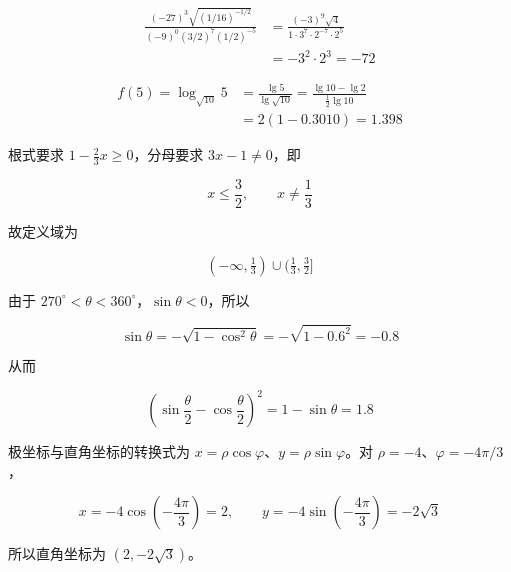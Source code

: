 \begin{answer}

\nopagebreak[4]
\[
\begin{aligned}
\frac{(-27)^3\sqrt{(1/16)^{-1/2}}}
{(-9)^0(3/2)^7(1/2)^{-5}}
&=\frac{(-3)^9\sqrt4}{1\cdot3^7\cdot2^{-7}\cdot2^5}\\
&=-3^2\cdot2^3=-72
\end{aligned}
\]


\nopagebreak[4]
\[
\begin{aligned}
f(5)=\log_{\sqrt{10}}5
&=\frac{\lg5}{\lg\sqrt{10}}
=\frac{\lg10-\lg2}{\frac12\lg10}\\
&=2(1-0.3010)=1.398
\end{aligned}
\]


根式要求 $1-\frac23x\ge0$，分母要求 $3x-1\ne0$，即

\nopagebreak[4]
\[
x\le\frac32,\qquad x\ne\frac13
\]

故定义域为

\nopagebreak[4]
\[
(-\infty,\tfrac13)\cup(\tfrac13,\tfrac32]
\]


由于 $270^\circ<\theta<360^\circ$，$\sin\theta<0$，所以

\nopagebreak[4]
\[
\sin\theta=-\sqrt{1-\cos^2\theta}=-\sqrt{1-0.6^2}=-0.8
\]

从而

\nopagebreak[4]
\[
\left(\sin\frac\theta2-\cos\frac\theta2\right)^2
=1-\sin\theta=1.8
\]


极坐标与直角坐标的转换式为 $x=\rho\cos\varphi$、$y=\rho\sin\varphi$。对 $\rho=-4$、$\varphi=-4\pi/3$，

\nopagebreak[4]
\[
x=-4\cos\left(-\frac{4\pi}{3}\right)=2,
\qquad
y=-4\sin\left(-\frac{4\pi}{3}\right)=-2\sqrt3
\]

所以直角坐标为 $(2,-2\sqrt3)$。




\gkanswer{答案（4）：$(-\infty,\frac13)\cup(\frac13,\frac32]$。}



\end{answer}
